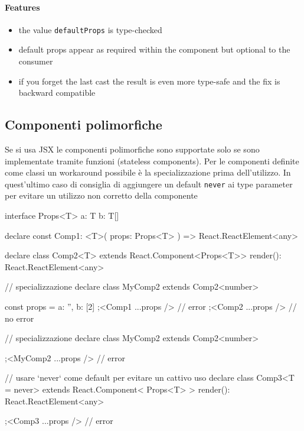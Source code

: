 \documentclass[12pt]{article}
\theoremstyle{definition}
\newenvironment{code}
  {\vspace{0.5cm} \VerbatimEnvironment\begin{typescriptcode}}
  {\end{typescriptcode} \vspace{0.2cm}}
\begin{document}
\paragraph{Features}

\begin{itemize}
  \item the value \texttt{defaultProps} is type-checked
  \item default props appear as required within the component but optional to the consumer
  \item if you forget the last cast the result is even more type-safe and the fix is backward compatible
\end{itemize}

\subsection{Componenti polimorfiche}

Se si usa JSX le componenti polimorfiche sono supportate solo se sono implementate tramite funzioni (stateless components).
Per le componenti definite come classi un workaround possibile è la specializzazione prima dell'utilizzo. In quest'ultimo caso
di consiglia di aggiungere un default \texttt{never} ai type parameter per evitare un utilizzo non corretto della componente

\begin{code}
interface Props<T> {
  a: T
  b: T[]
}

declare const Comp1: <T>(
  props: Props<T>
) => React.ReactElement<any>

declare class Comp2<T> extends React.Component<Props<T>> {
  render(): React.ReactElement<any>
}

// specializzazione
declare class MyComp2 extends Comp2<number> {}

const props = {
  a: '',
  b: [2]
}
;<Comp1 {...props} /> // error
;<Comp2 {...props} /> // no error

// specializzazione
declare class MyComp2 extends Comp2<number> {}

;<MyComp2 {...props} /> // error

// usare `never` come default per evitare un cattivo uso
declare class Comp3<T = never> extends React.Component<
  Props<T>
> {
  render(): React.ReactElement<any>
}

;<Comp3 {...props} /> // error
\end{code}
\end{document}
